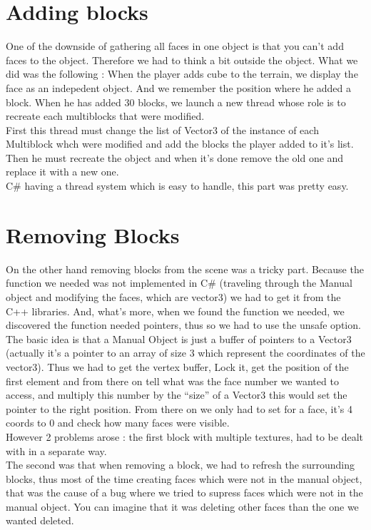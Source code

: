 \documentclass[article]{report}             %
\begin{document}
			\section{Adding blocks}
				One of the downside of gathering all faces in one object is that you can't add faces to the object. Therefore we had to think a bit outside the object. What we did was the following : When the player adds cube to the terrain, we display the face as an indepedent object. And  we remember the position where he added a block. When he has added 30 blocks, we launch a new thread whose role is to recreate each multiblocks that were modified.\\

				First this thread must change the list of Vector3 of the instance of each Multiblock whch were modified and add the blocks the player added to it's list. Then he must recreate the object and when it's done remove the old one and replace it with a new one.\\

				C\# having a thread system which is easy to handle, this part was pretty easy.
				
			\section{Removing Blocks}
				On the other hand removing blocks from the scene was a tricky part. Because the function we needed was not implemented in C\# (traveling through the Manual object and modifying the faces, which are vector3) we had to get it from the C++ libraries. And, what's more, when we found the function we needed, we discovered the function needed pointers, thus so we had to use the unsafe option.\\

				The basic idea is that a Manual Object is just a buffer of pointers to a Vector3 (actually it's a pointer to an array of size 3 which represent the coordinates of the vector3). Thus we had to get the vertex buffer, Lock it, get the position of the first element and from there on tell what was the face number we wanted to access, and multiply this number by the \enquote{size} of a Vector3 this would set the pointer to the right position. From there on we only had to set for a face, it's 4 coords to 0 and check how many faces were visible.\\

				However 2 problems arose : the first block with multiple textures, had to be dealt with in a separate way. \\
				The second was that when removing a block, we had to refresh the surrounding blocks, thus most of the time creating faces which were not in the manual object, that was the cause of a bug where we tried to supress faces which were not in the manual object. You can imagine that it was deleting other faces than the one we wanted deleted.
\end{document}
